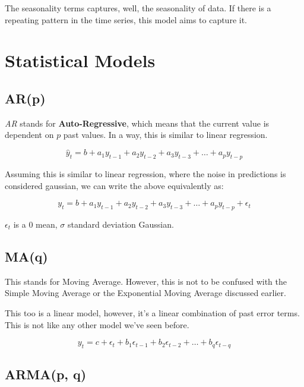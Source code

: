 The seasonality terms captures, well, the seasonality of data. If there is a repeating pattern in the time series, this model aims to capture it.

\section{Statistical Models}

\subsection{AR(p)}

\emph{AR} stands for \textbf{Auto-Regressive}, which means that the current value is dependent on $p$ past values. In a way, this is similar to linear regression.

\[
\hat y_t = b + a_{1}y_{t-1} + a_{2}y_{t-2} + a_{3}y_{t-3} + \dots + a_{p}y_{t-p}
\]

Assuming this is similar to linear regression, where the noise in predictions is considered gaussian, we can write the above equivalently as:

\[
y_t = b + a_{1}y_{t-1} + a_{2}y_{t-2} + a_{3}y_{t-3} + \dots + a_{p}y_{t-p} + \epsilon_t
\]

$\epsilon$$_t$ is a 0 mean, $\sigma$ standard deviation Gaussian.

\subsection{MA(q)}

This stands for Moving Average. However, this is not to be confused with the Simple Moving Average or the Exponential Moving Average discussed earlier.

This too is a linear model, however, it’s a linear combination of past error terms. This is not like any other model we’ve seen before.

\[
y_t = c + \epsilon_{t} + b_1 \epsilon_{t-1} + b_2 \epsilon_{t-2} + \dots + b_q \epsilon_{t-q}
\]


\subsection{ARMA(p, q)}

